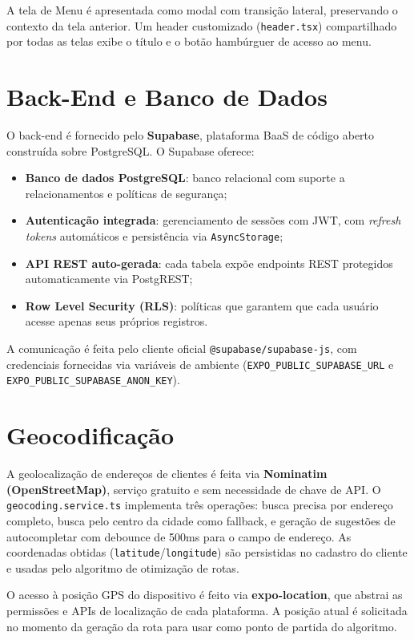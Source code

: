 \documentclass[
	12pt,				%
	oneside,			%
	a4paper,			%
	english,			%
	brazil				%
	]{abntex2}
\begin{document}
A tela de Menu é apresentada como modal com transição lateral, preservando o contexto da tela anterior. Um header customizado (\texttt{header.tsx}) compartilhado por todas as telas exibe o título e o botão hambúrguer de acesso ao menu.

\section{Back-End e Banco de Dados}

O back-end é fornecido pelo \textbf{Supabase}, plataforma BaaS de código aberto construída sobre PostgreSQL. O Supabase oferece:

\begin{itemize}
  \item \textbf{Banco de dados PostgreSQL}: banco relacional com suporte a relacionamentos e políticas de segurança;
  \item \textbf{Autenticação integrada}: gerenciamento de sessões com JWT, com \textit{refresh tokens} automáticos e persistência via \texttt{AsyncStorage};
  \item \textbf{API REST auto-gerada}: cada tabela expõe endpoints REST protegidos automaticamente via PostgREST;
  \item \textbf{Row Level Security (RLS)}: políticas que garantem que cada usuário acesse apenas seus próprios registros.
\end{itemize}

A comunicação é feita pelo cliente oficial \texttt{@supabase/supabase-js}, com credenciais fornecidas via variáveis de ambiente (\texttt{EXPO\_PUBLIC\_SUPABASE\_URL} e \texttt{EXPO\_PUBLIC\_SUPABASE\_ANON\_KEY}).

\section{Geocodificação}

A geolocalização de endereços de clientes é feita via \textbf{Nominatim (OpenStreetMap)}, serviço gratuito e sem necessidade de chave de API. O \texttt{geocoding.service.ts} implementa três operações: busca precisa por endereço completo, busca pelo centro da cidade como fallback, e geração de sugestões de autocompletar com debounce de 500ms para o campo de endereço. As coordenadas obtidas (\texttt{latitude}/\texttt{longitude}) são persistidas no cadastro do cliente e usadas pelo algoritmo de otimização de rotas.

O acesso à posição GPS do dispositivo é feito via \textbf{expo-location}, que abstrai as permissões e APIs de localização de cada plataforma. A posição atual é solicitada no momento da geração da rota para usar como ponto de partida do algoritmo.
\end{document}
